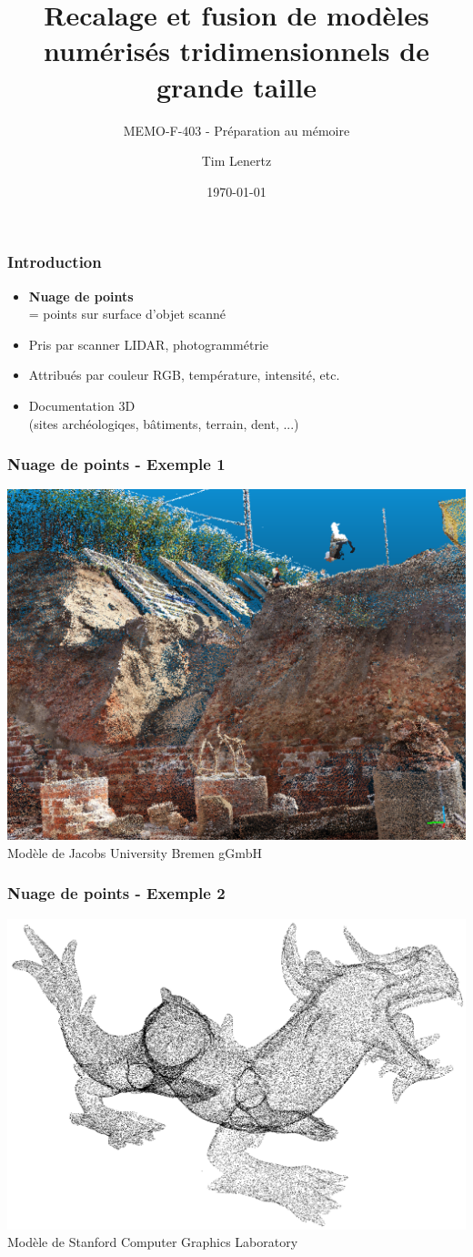 \documentclass{beamer}
\title{Recalage et fusion de modèles numérisés tridimensionnels de grande taille}
\subtitle{MEMO-F-403 - Préparation au mémoire}
\author{Tim Lenertz}
\date{\today}
\institute{ULB}
\begin{document}
\begin{frame}
\frametitle{Introduction}
	\begin{itemize}
	\item \textbf{Nuage de points}\\
		= points sur surface d'objet scanné
	\item Pris par scanner LIDAR, photogrammétrie
	\item Attribués par couleur RGB, température, intensité, etc.
	\item Documentation 3D \\
		(sites archéologiqes, bâtiments, terrain, dent, ...)
	\end{itemize}
\end{frame}

\begin{frame}
\frametitle{Nuage de points - Exemple 1}
	\center
	\includegraphics[width=.8\textwidth]{tower_screenshot.png} \\
	\footnotesize{Modèle de Jacobs University Bremen gGmbH}
\end{frame}

\begin{frame}
\frametitle{Nuage de points - Exemple 2}
	\center
	\includegraphics[width=.9\textwidth]{dragon_screenshot.png} \\
	\footnotesize{Modèle de Stanford Computer Graphics Laboratory}
\end{frame}
\end{document}
